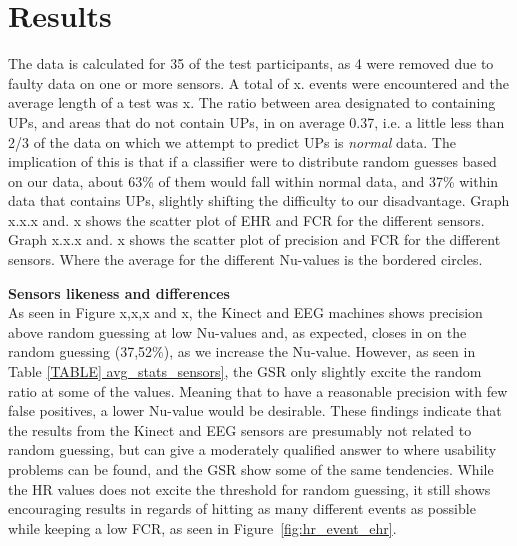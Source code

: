 \section{Results}
The data is calculated for 35 of the test participants, as 4 were removed due to faulty data on one or more sensors.	
A total of x. events were encountered and the average length of a test was x.
The ratio between area designated to containing UPs, and areas that do not contain UPs, in on average 0.37, i.e. a
little less than 2/3 of the data on which we attempt to predict UPs is \textit{normal} data. The implication of this is
that if a classifier were to distribute random guesses based on our data, about 63\% of them would fall within normal
data, and 37\% within data that contains UPs, slightly shifting the difficulty to our disadvantage.
Graph x.x.x and. x shows the scatter plot of EHR and FCR for the different sensors. 
Graph x.x.x and. x shows the scatter plot of precision and FCR for the different sensors. Where the average for the different Nu-values is the bordered circles.



\textbf{Sensors likeness and differences}\\
As seen in Figure x,x,x and x, the Kinect and EEG machines shows precision above random guessing at low Nu-values and,
as expected, closes in on the random guessing (37,52\%), as we increase the Nu-value. However, as seen in Table
\ref{TABLE] avg_stats_sensors}, the GSR only slightly excite the random ratio at some of the values. Meaning that
to have a reasonable precision with few false positives, a lower Nu-value would be desirable.
These findings indicate that the results from the Kinect and EEG sensors are presumably not related to random guessing, but can give a moderately qualified answer to where usability problems can be found, and the GSR show some of the same tendencies.
While the HR values does not excite the threshold for random guessing, it still shows encouraging results in regards of hitting as many different events as possible while keeping a low FCR, as seen in Figure~\ref{fig:hr_event_ehr}.






